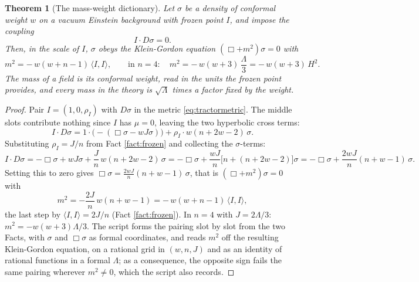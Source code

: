 \documentclass[11pt]{article}
\newtheorem{theorem}{Theorem}[section]
\theoremstyle{definition}
\newcommand{\ip}[2]{\langle #1, #2\rangle}
\begin{document}
\begin{theorem}[The mass-weight dictionary]\label{thm:dictionary}
Let $\sigma$ be a density of conformal weight $w$ on a vacuum Einstein background with frozen point $I$, and impose the coupling
\[
I \cdot D\sigma = 0.
\]
Then, in the scale of $I$, $\sigma$ obeys the Klein-Gordon equation $(\Box + m^{2})\sigma = 0$ with
\begin{equation}\label{eq:dictionary}
m^{2} = -\,w(w+n-1)\,\ip{I}{I}, \qquad\text{in } n = 4:\quad m^{2} = -\,w(w+3)\,\frac{\Lambda}{3} = -\,w(w+3)\,H^{2}.
\end{equation}
The mass of a field is its conformal weight, read in the units the frozen point provides, and every mass in the theory is $\sqrt{\Lambda}$ times a factor fixed by the weight.
\end{theorem}

\begin{proof}
Pair $I = (1, 0, \rho_{I})$ with $D\sigma$ in the metric \eqref{eq:tractormetric}. The middle slots contribute nothing since $I$ has $\mu = 0$, leaving the two hyperbolic cross terms:
\[
I \cdot D\sigma = 1 \cdot \bigl(-(\Box\sigma - wJ\sigma)\bigr) + \rho_{I} \cdot w(n+2w-2)\,\sigma .
\]
Substituting $\rho_{I} = J/n$ from Fact \ref{fact:frozen} and collecting the $\sigma$-terms:
\[
I \cdot D\sigma = -\Box\sigma + wJ\sigma + \frac{J}{n}\,w(n+2w-2)\,\sigma
= -\Box\sigma + \frac{wJ}{n}\bigl[n + (n+2w-2)\bigr]\sigma
= -\Box\sigma + \frac{2wJ}{n}(n+w-1)\,\sigma .
\]
Setting this to zero gives $\Box\sigma = \tfrac{2wJ}{n}(n+w-1)\,\sigma$, that is $(\Box + m^{2})\sigma = 0$ with
\[
m^{2} = -\frac{2J}{n}\,w(n+w-1) = -\,w(w+n-1)\,\ip{I}{I},
\]
the last step by $\ip{I}{I} = 2J/n$ (Fact \ref{fact:frozen}). In $n = 4$ with $J = 2\Lambda/3$: $m^{2} = -w(w+3)\Lambda/3$. The script forms the pairing slot by slot from the two Facts, with $\sigma$ and $\Box\sigma$ as formal coordinates, and reads $m^{2}$ off the resulting Klein-Gordon equation, on a rational grid in $(w, n, J)$ and as an identity of rational functions in a formal $\Lambda$; as a consequence, the opposite sign fails the same pairing wherever $m^{2} \neq 0$, which the script also records.
\end{proof}
\end{document}
